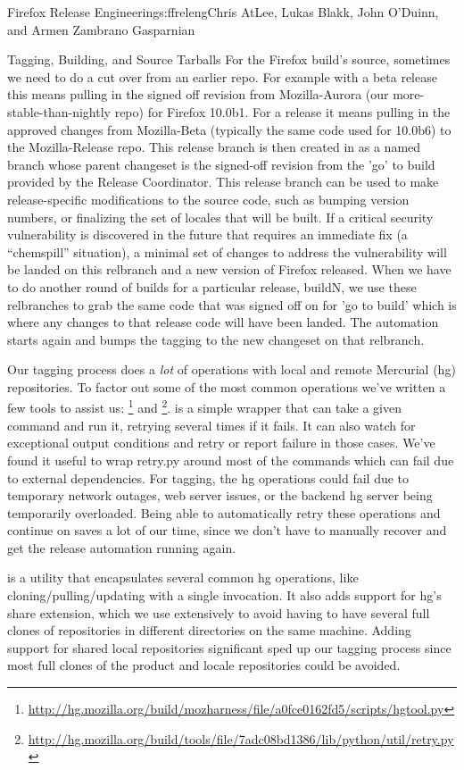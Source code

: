 \begin{aosachapter}{Firefox Release Engineering}{s:ffreleng}{Chris AtLee, Lukas Blakk, John O'Duinn, and Armen Zambrano Gasparnian}
\begin{aosasect1}{Tagging, Building, and Source Tarballs}
For the Firefox build's source, sometimes we need to do a cut over
from an earlier repo. For example with a beta release this means
pulling in the signed off revision from Mozilla-Aurora (our
more-stable-than-nightly repo) for Firefox 10.0b1. For a release it
means pulling in the approved changes from Mozilla-Beta (typically the
same code used for 10.0b6) to the Mozilla-Release repo.  This release
branch is then created in as a named branch whose parent changeset is
the signed-off revision from the 'go' to build provided by the Release
Coordinator. This release branch can be used to make release-specific
modifications to the source code, such as bumping version numbers, or
finalizing the set of locales that will be built. If a critical
security vulnerability is discovered in the future that requires an
immediate fix (a ``chemspill'' situation), a minimal set of changes to
address the vulnerability will be landed on this relbranch and a new
version of Firefox released. When we have to do another round of
builds for a particular release, buildN, we use these relbranches to
grab the same code that was signed off on for 'go to build' which is
where any changes to that release code will have been landed. The
automation starts again and bumps the tagging to the new changeset on
that relbranch.
    
Our tagging process does a \emph{lot} of operations with local and
remote Mercurial (hg) repositories. To factor out some of the most
common operations we've written a few tools to assist us:
\footnote{\url{http://hg.mozilla.org/build/mozharness/file/a0fce0162fd5/scripts/hgtool.py}}
and
\footnote{\url{http://hg.mozilla.org/build/tools/file/7adc08bd1386/lib/python/util/retry.py}}.
 is a simple wrapper that can take a given command and
run it, retrying several times if it fails. It can also watch for
exceptional output conditions and retry or report failure in those
cases. We've found it useful to wrap retry.py around most of the
commands which can fail due to external dependencies.  For tagging,
the hg operations could fail due to temporary network outages, web
server issues, or the backend hg server being temporarily
overloaded. Being able to automatically retry these operations and
continue on saves a lot of our time, since we don't have to manually
recover and get the release automation running again.
    
 is a utility that encapsulates several common hg
operations, like cloning/pulling/updating with a single invocation. It
also adds support for hg's share extension, which we use extensively
to avoid having to have several full clones of repositories in
different directories on the same machine.  Adding support for shared
local repositories significant sped up our tagging process since most
full clones of the product and locale repositories could be avoided.
    

\end{aosasect1}
\end{aosachapter}
